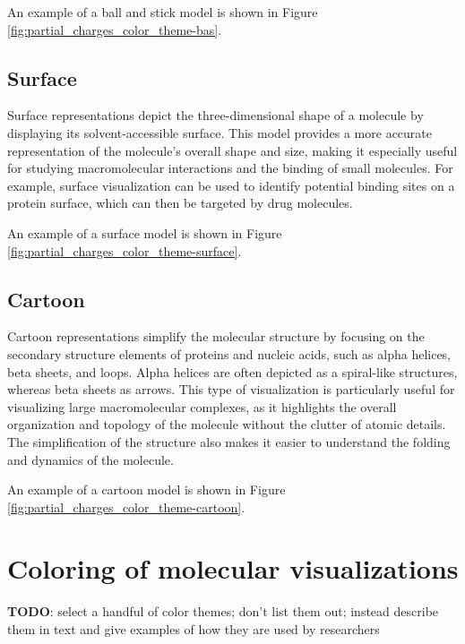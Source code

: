\documentclass[
  digital,     %
  oneside,     %
  nosansbold,  %
  nocolorbold, %
  lof,         %
  lot,         %
]{fithesis4}
\begin{document}
An example of a ball and stick model is shown in Figure \ref{fig:partial_charges_color_theme-bas}.

\subsection{Surface}
\label{subsection:surface}

Surface representations depict the three-dimensional shape of a molecule by displaying its solvent-accessible surface.
This model provides a more accurate representation of the molecule's overall shape and size, making it especially useful for studying macromolecular interactions and the binding of small molecules.
For example, surface visualization can be used to identify potential binding sites on a protein surface, which can then be targeted by drug molecules.

An example of a surface model is shown in Figure \ref{fig:partial_charges_color_theme-surface}.

\subsection{Cartoon}
\label{subsection:cartoon}

Cartoon representations simplify the molecular structure by focusing on the secondary structure elements of proteins and nucleic acids, such as alpha helices, beta sheets, and loops. Alpha helices are often depicted as a spiral-like structures, whereas beta sheets as arrows. This type of visualization is particularly useful for visualizing large macromolecular complexes, as it highlights the overall organization and topology of the molecule without the clutter of atomic details. The simplification of the structure also makes it easier to understand the folding and dynamics of the molecule.

An example of a cartoon model is shown in Figure \ref{fig:partial_charges_color_theme-cartoon}.

\section{Coloring of molecular visualizations}
\label{subsection:coloring_of_molecular_visualizations}

\textbf{TODO}: select a handful of color themes; don't list them out; instead describe them in text and give examples of how they are used by researchers \\
\end{document}
